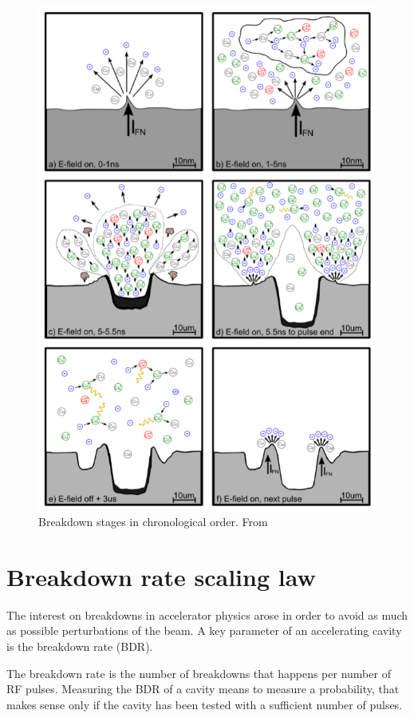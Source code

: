 \begin{figure}[h]
\centering
\includegraphics[scale=0.4]{pictures/BD_process}
\caption{Breakdown stages in chronological order. From \cite{Kovermann:1330346}}
\label{BD_rocess}
\end{figure}


\section[Breakdown rate scaling law]{Breakdown rate scaling law}

The interest on breakdowns in accelerator physics arose in order to avoid as much as possible perturbations of the beam. A key parameter of an accelerating cavity is the breakdown rate (BDR).

The breakdown rate is the number of breakdowns that happens per number of RF pulses. Measuring the BDR of a cavity means to measure a probability, that makes sense only if the cavity has been tested with a sufficient number of pulses. 

